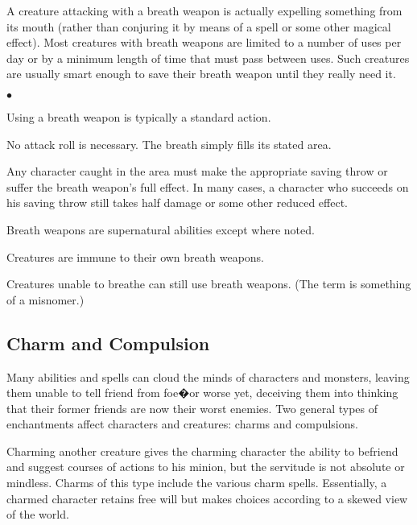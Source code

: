 A creature attacking with a breath weapon is actually expelling something from its mouth (rather than conjuring it by means of a spell or some other magical effect). Most creatures with breath weapons are limited to a number of uses per day or by a minimum length of time that must pass between uses. Such creatures are usually smart enough to save their breath weapon until they really need it.

\begin{list}{$\bullet$}{\itemspace}
	\item Using a breath weapon is typically a standard action.
	\item No attack roll is necessary. The breath simply fills its stated area.
	\item Any character caught in the area must make the appropriate saving throw or suffer the breath weapon's full effect. In many cases, a character who succeeds on his saving throw still takes half damage or some other reduced effect.
	\item Breath weapons are supernatural abilities except where noted.
	\item Creatures are immune to their own breath weapons.
	\item Creatures unable to breathe can still use breath weapons. (The term is something of a misnomer.)
\end{list}

\subsection{Charm and Compulsion}

Many abilities and spells can cloud the minds of characters and monsters, leaving them unable to tell friend from foe�or worse yet, deceiving them into thinking that their former friends are now their worst enemies. Two general types of enchantments affect characters and creatures: charms and compulsions.

Charming another creature gives the charming character the ability to befriend and suggest courses of actions to his minion, but the servitude is not absolute or mindless. Charms of this type include the various charm spells. Essentially, a charmed character retains free will but makes choices according to a skewed view of the world.


